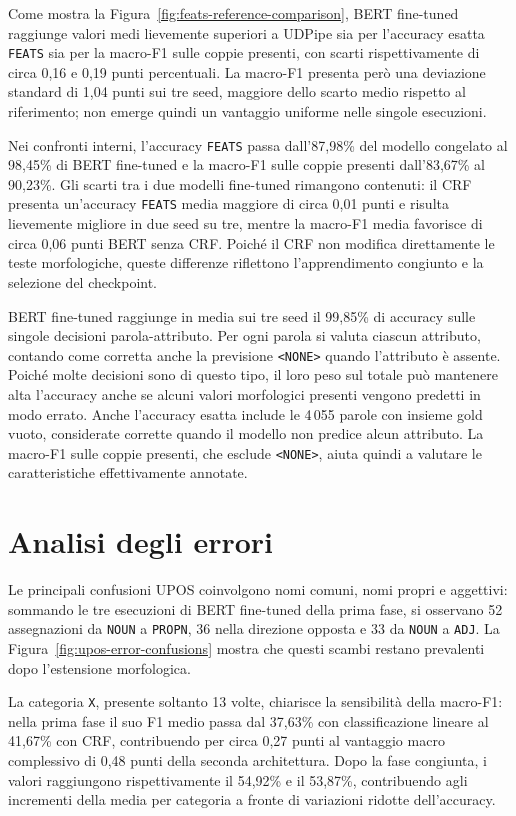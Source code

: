 \documentclass[12pt,a4paper]{report}
\begin{document}
Come mostra la Figura~\ref{fig:feats-reference-comparison}, BERT fine-tuned raggiunge valori medi lievemente superiori a UDPipe sia per l'accuracy esatta \texttt{FEATS} sia per la macro-F1 sulle coppie presenti, con scarti rispettivamente di circa 0,16 e 0,19 punti percentuali. La macro-F1 presenta però una deviazione standard di 1,04 punti sui tre seed, maggiore dello scarto medio rispetto al riferimento; non emerge quindi un vantaggio uniforme nelle singole esecuzioni.

Nei confronti interni, l'accuracy \texttt{FEATS} passa dall'87,98\% del modello congelato al 98,45\% di BERT fine-tuned e la macro-F1 sulle coppie presenti dall'83,67\% al 90,23\%. Gli scarti tra i due modelli fine-tuned rimangono contenuti: il CRF presenta un'accuracy \texttt{FEATS} media maggiore di circa 0,01 punti e risulta lievemente migliore in due seed su tre, mentre la macro-F1 media favorisce di circa 0,06 punti BERT senza CRF. Poiché il CRF non modifica direttamente le teste morfologiche, queste differenze riflettono l'apprendimento congiunto e la selezione del checkpoint.

BERT fine-tuned raggiunge in media sui tre seed il 99,85\% di accuracy sulle singole decisioni parola-attributo. Per ogni parola si valuta ciascun attributo, contando come corretta anche la previsione \texttt{<NONE>} quando l'attributo è assente. Poiché molte decisioni sono di questo tipo, il loro peso sul totale può mantenere alta l'accuracy anche se alcuni valori morfologici presenti vengono predetti in modo errato. Anche l'accuracy esatta include le 4\,055 parole con insieme gold vuoto, considerate corrette quando il modello non predice alcun attributo. La macro-F1 sulle coppie presenti, che esclude \texttt{<NONE>}, aiuta quindi a valutare le caratteristiche effettivamente annotate.

\section{Analisi degli errori}
\label{sec:results-errors}

Le principali confusioni UPOS coinvolgono nomi comuni, nomi propri e aggettivi: sommando le tre esecuzioni di BERT fine-tuned della prima fase, si osservano 52 assegnazioni da \texttt{NOUN} a \texttt{PROPN}, 36 nella direzione opposta e 33 da \texttt{NOUN} a \texttt{ADJ}. La Figura~\ref{fig:upos-error-confusions} mostra che questi scambi restano prevalenti dopo l'estensione morfologica.

La categoria \texttt{X}, presente soltanto 13 volte, chiarisce la sensibilità della macro-F1: nella prima fase il suo F1 medio passa dal 37,63\% con classificazione lineare al 41,67\% con CRF, contribuendo per circa 0,27 punti al vantaggio macro complessivo di 0,48 punti della seconda architettura. Dopo la fase congiunta, i valori raggiungono rispettivamente il 54,92\% e il 53,87\%, contribuendo agli incrementi della media per categoria a fronte di variazioni ridotte dell'accuracy.
\end{document}
